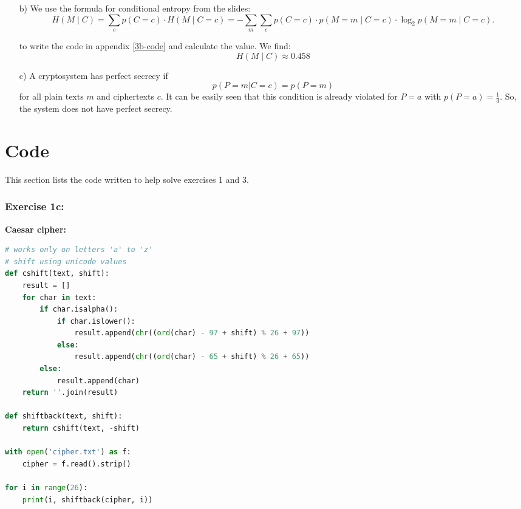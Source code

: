 \documentclass[10pt, oneside]{article}
\begin{document}
\begin{itemize}
    \item[b)]We use the formula for conditional entropy from the slides: 
    \[H(M \mid C) = \sum_{c} p(C = c) \cdot H(M \mid C = c) 
    = - \sum_{m} \sum_{c} p(C = c) \cdot p(M = m \mid C = c) \cdot \log_2 p(M = m \mid C = c). \]    

    to write the code in appendix \ref{3b-code} and calculate the value. We find:
    \[H(M \mid C) \approx 0.458\] 
    \item[c)] A cryptosystem has perfect secrecy if \[ p(P=m | C=c) = p(P=m) \] for all plain texts $m$ and ciphertexts $c$. It can be easily seen that this condition is already violated for $P=a$ with $p(P=a) = \frac{1}{3}$. So, the system does not have perfect secrecy. 

\end{itemize}


\appendix

\section{Code}
This section lists the code written to help solve exercises 1 and 3. 
\subsubsection{Exercise 1c:}

\textbf{Caesar cipher:} \label{caesar}
\begin{lstlisting}[language=Python]
# works only on letters 'a' to 'z'
# shift using unicode values
def cshift(text, shift):
    result = []
    for char in text:
        if char.isalpha():
            if char.islower():
                result.append(chr((ord(char) - 97 + shift) % 26 + 97))
            else:
                result.append(chr((ord(char) - 65 + shift) % 26 + 65))
        else:
            result.append(char)
    return ''.join(result)

def shiftback(text, shift):
    return cshift(text, -shift)

with open('cipher.txt') as f:
    cipher = f.read().strip()

for i in range(26):
    print(i, shiftback(cipher, i))
\end{lstlisting}
\end{document}
